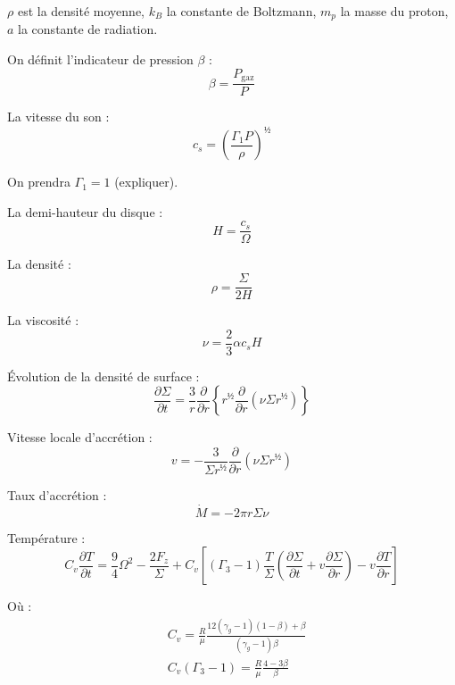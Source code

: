 $\rho$ est la densité moyenne, $k_B$ la constante de Boltzmann, $m_p$ la masse du proton, $a$ la constante de radiation.

On définit l’indicateur de pression $\beta$ :
\begin{equation}
    \beta = \frac{P_{\mathrm{gaz}}}{P}
\end{equation}

La vitesse du son :
\begin{equation}
    c_s = \left( \frac{\Gamma_1 P}{\rho} \right)^½
\end{equation}

On prendra $\Gamma_1 = 1$ (expliquer).

La demi-hauteur du disque :
\begin{equation}
    H = \frac{c_s}{\Omega}
\end{equation}

La densité :
\begin{equation}
    \rho = \frac{\Sigma}{2 H}
\end{equation}

La viscosité :
\begin{equation}
    \nu = \frac{2}{3} \alpha c_s H
\end{equation}

Évolution de la densité de surface :
\begin{equation}
    \frac{\partial \Sigma}{\partial t} = \frac{3}{r} \frac{\partial}{\partial r} \left\{ r^½ \frac{\partial}{\partial r} \left(\nu \Sigma r^½ \right) \right\}
\end{equation}

Vitesse locale d’accrétion :
\begin{equation}
    v = − \frac{3}{\Sigma r^½} \frac{\partial}{\partial r} \left( \nu \Sigma r^½ \right)
\end{equation}

Taux d’accrétion :
\begin{equation}
    \dot{M} = − 2 \pi r \Sigma \nu
\end{equation}

Température :
\begin{equation}
    C_v \frac{\partial T}{\partial t} = \frac{9}{4} \Omega^2 − \frac{2 F_z}{\Sigma} + C_v \left[ (\Gamma_3 − 1) \frac{T}{\Sigma} \left( \frac{\partial \Sigma}{\partial t} + v \frac{\partial \Sigma}{\partial r}  \right) − v \frac{\partial T}{\partial r} \right]
\end{equation}

Où :
\begin{align}
    &C_v = \frac{R}{\mu} \frac{12 (\gamma_g − 1)(1 − \beta) + \beta}{(\gamma_g − 1) \beta} \\
    &C_v (\Gamma_3 − 1) = \frac{R}{\mu} \frac{4 − 3\beta}{\beta}
\end{align}

